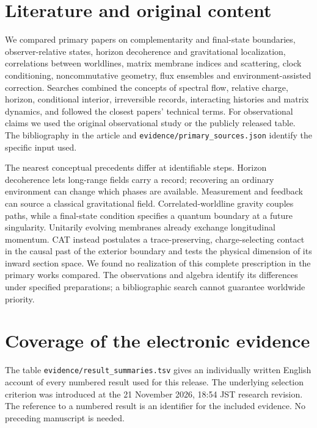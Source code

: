 \section{Literature and original content}
We compared primary papers on complementarity and final-state boundaries, observer-relative states, horizon decoherence and gravitational localization, correlations between worldlines, matrix membrane indices and scattering, clock conditioning, noncommutative geometry, flux ensembles and environment-assisted correction. Searches combined the concepts of spectral flow, relative charge, horizon, conditional interior, irreversible records, interacting histories and matrix dynamics, and followed the closest papers' technical terms. For observational claims we used the original observational study or the publicly released table. The bibliography in the article and \texttt{evidence/primary\_sources.json} identify the specific input used.

The nearest conceptual precedents differ at identifiable steps. Horizon decoherence lets long-range fields carry a record; recovering an ordinary environment can change which phases are available. Measurement and feedback can source a classical gravitational field. Correlated-worldline gravity couples paths, while a final-state condition specifies a quantum boundary at a future singularity. Unitarily evolving membranes already exchange longitudinal momentum. CAT instead postulates a trace-preserving, charge-selecting contact in the causal past of the exterior boundary and tests the physical dimension of its inward section space. We found no realization of this complete prescription in the primary works compared. The observations and algebra identify its differences under specified preparations; a bibliographic search cannot guarantee worldwide priority.

\section{Coverage of the electronic evidence}
The table \texttt{evidence/result\_summaries.tsv} gives an individually written English account of every numbered result used for this release. The underlying selection criterion was introduced at the 21 November 2026, 18:54 JST research revision. The reference to a numbered result is an identifier for the included evidence. No preceding manuscript is needed.

